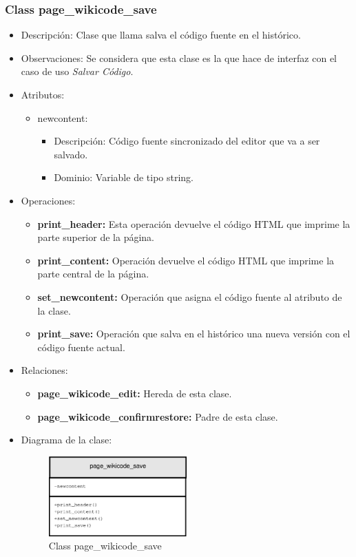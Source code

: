 \subsubsection{Class page\_wikicode\_save}

\begin{itemize}
	\item Descripción: Clase que llama salva el código fuente en el histórico.
	\item Observaciones: Se considera que esta clase es la que hace de interfaz con el caso de uso \emph{Salvar Código}.
	\item Atributos:
		\begin{itemize}
			\item newcontent:
				\begin{itemize}
					\item Descripción: Código fuente sincronizado del editor que va a ser salvado.
					\item Dominio: Variable de tipo string.
				\end{itemize}
		\end{itemize}
	\item Operaciones:
		\begin{itemize}
			\item \textbf{print\_header: }Esta operación devuelve el código HTML que imprime la parte superior de la página.
			\item \textbf{print\_content: }Operación devuelve el código HTML que imprime la parte central de la página.
			\item \textbf{set\_newcontent: }Operación que asigna el código fuente al atributo de la clase.
			\item \textbf{print\_save: }Operación que salva en el histórico una nueva versión con el código fuente actual.
		\end{itemize}
	\item Relaciones:
		\begin{itemize}
			\item \textbf{page\_wikicode\_edit:} Hereda de esta clase.
			\item \textbf{page\_wikicode\_confirmrestore:} Padre de esta clase.
		\end{itemize}
	\item Diagrama de la clase:
		\begin{figure}[h]
			\centering
			\includegraphics[width=0.5\textwidth]{./img/page_wikicode_save.eps}
			\caption{Class page\_wikicode\_save}
		\end{figure}
\end{itemize}

